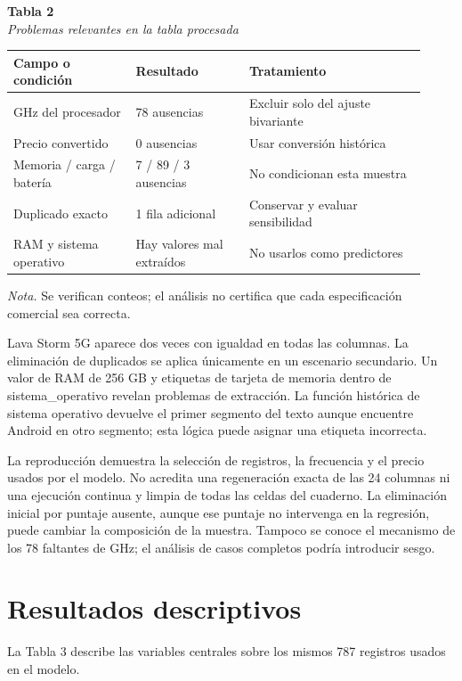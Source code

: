 \documentclass[12pt,letterpaper]{article}
\begin{document}
\begin{center}\begin{minipage}{\linewidth}\textbf{Tabla 2}\\\textit{Problemas relevantes en la tabla procesada}\\\begin{singlespace}\small
\begin{tabular}{@{}p{0.2735\linewidth}p{0.2585\linewidth}p{0.3910\linewidth}@{}}\toprule
\textbf{Campo o condición} & \textbf{Resultado} & \textbf{Tratamiento}\\\midrule
GHz del procesador & 78 ausencias & Excluir solo del ajuste bivariante\\
Precio convertido & 0 ausencias & Usar conversión histórica\\
Memoria / carga / batería & 7 / 89 / 3 ausencias & No condicionan esta muestra\\
Duplicado exacto & 1 fila adicional & Conservar y evaluar sensibilidad\\
RAM y sistema operativo & Hay valores mal extraídos & No usarlos como predictores\\
\bottomrule\end{tabular}\end{singlespace}
\small\textit{Nota.} Se verifican conteos; el análisis no certifica que cada especificación comercial sea correcta.
\end{minipage}\end{center}
Lava Storm 5G aparece dos veces con igualdad en todas las columnas. La eliminación de duplicados se aplica únicamente en un escenario secundario. Un valor de RAM de 256 GB y etiquetas de tarjeta de memoria dentro de sistema\_operativo revelan problemas de extracción. La función histórica de sistema operativo devuelve el primer segmento del texto aunque encuentre Android en otro segmento; esta lógica puede asignar una etiqueta incorrecta.

La reproducción demuestra la selección de registros, la frecuencia y el precio usados por el modelo. No acredita una regeneración exacta de las 24 columnas ni una ejecución continua y limpia de todas las celdas del cuaderno. La eliminación inicial por puntaje ausente, aunque ese puntaje no intervenga en la regresión, puede cambiar la composición de la muestra. Tampoco se conoce el mecanismo de los 78 faltantes de GHz; el análisis de casos completos podría introducir sesgo.

\clearpage
\section*{Resultados descriptivos}
La Tabla 3 describe las variables centrales sobre los mismos 787 registros usados en el modelo.
\end{document}
